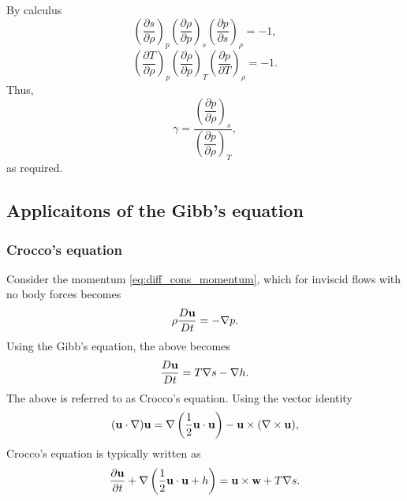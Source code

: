 \documentclass[oneside,a4paper,11pt]{report}
\begin{document}
By calculus
\begin{equation}
    \left( \frac{\partial s}{\partial \rho} \right)_p \left( \frac{\partial \rho}{\partial p} \right)_s \left( \frac{\partial p}{\partial s} \right)_\rho = -1,
\end{equation}
\begin{equation}
    \left( \frac{\partial T}{\partial \rho} \right)_p \left( \frac{\partial \rho}{\partial p} \right)_T \left( \frac{\partial p}{\partial T} \right)_\rho = -1.
\end{equation}
Thus,
\begin{equation}
    \gamma = \frac{ \left( \dfrac{\partial p}{\partial \rho} \right)_s }{\left( \dfrac{\partial p}{\partial \rho} \right)_T},
\end{equation}
as required.

\subsection{Applicaitons of the Gibb's equation}

\subsubsection{Crocco's equation}
Consider the momentum \cref{eq:diff_cons_momentum}, which for inviscid flows with no body forces becomes
\begin{equation}
    \rho \frac{D \mathbf{u}}{Dt} = -\nabla p.
\end{equation}
Using the Gibb's equation, the above becomes
\begin{equation}
    \frac{D \mathbf{u}}{Dt} = T\nabla s - \nabla h.
\end{equation}
The above is referred to as Crocco's equation. Using the vector identity
\begin{equation}
    (\mathbf{u} \cdot \nabla) \mathbf{u} = \nabla \left ( \frac{1}{2} \mathbf{u} \cdot \mathbf{u} \right ) - \mathbf{u} \times (\nabla \times \mathbf{u}),
\end{equation}
Crocco's equation is typically written as
\begin{equation}
    \frac{\partial \mathbf{u}}{\partial t} + \nabla \left (\frac{1}{2} \mathbf{u} \cdot \mathbf{u} + h \right ) = \mathbf{u} \times \mathbf{w} + T \nabla s.
\end{equation}
\end{document}
